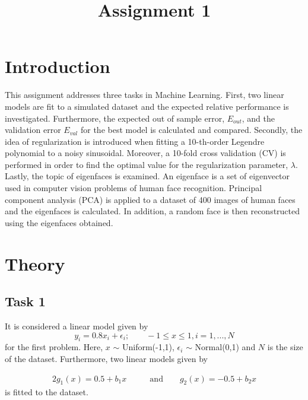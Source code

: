 \documentclass[a4paper,10pt]{article}
\begin{document}
\setlength\parindent{0pt}


\title{Assignment 1}
\clearpage\maketitle
\thispagestyle{empty}

\begin{abstract}

\end{abstract}

\newpage
\clearpage
\setcounter{page}{1}

\section{Introduction}
This assignment addresses three tasks in Machine Learning. First, two linear models are fit
to a simulated dataset and the expected relative performance is investigated. Furthermore,
the expected out of sample error, $E_{out}$, and the validation error $E_{val}$ for the best
model is calculated and compared. Secondly, the idea of regularization is introduced
when fitting a 10-th-order Legendre polynomial to a noisy sinusoidal. Moreover,
a 10-fold cross validation (CV) is performed in order to find the optimal value for the
regularization parameter, $\lambda$. Lastly, the topic of eigenfaces is examined. An eigenface is
a set of eigenvector used in computer vision problems of human face recognition.
Principal component analysis (PCA) is applied to a dataset of 400 images of human faces and
the eigenfaces is calculated. In addition, a random face is then reconstructed using the eigenfaces
obtained.

\section{Theory}
\subsection{Task 1}
It is considered a linear model given by
\begin{equation}
  y_i = 0.8x_i + \epsilon_i;\qquad -1 \leq x \leq1, i=1,...,N
  \label{eq:underlying_function}
\end{equation}
for the first problem. Here, $x$ $\sim$ Uniform(-1,1), $\epsilon_i$ $\sim$ Normal(0,1) and $N$ is the
size of the dataset. Furthermore, two linear models given by

\begin{alignat*}{2}
  g_1(x) = 0.5 + b_1x  &\qquad\text{and}\qquad g_2(x) = -0.5 + b_2x
\end{alignat*}
is fitted to the dataset. \newline
\end{document}
